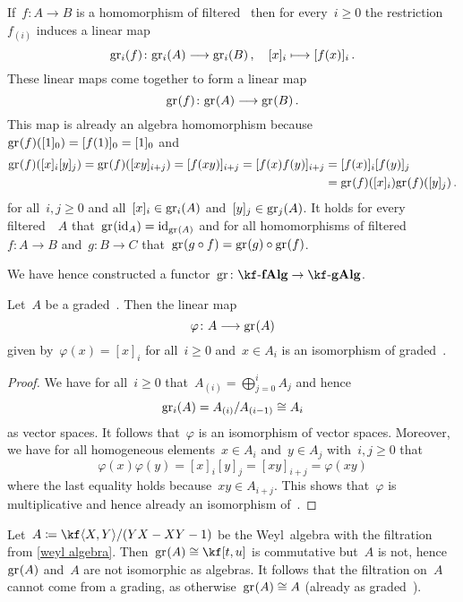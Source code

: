 \begin{construction}
  If~$f \colon A \to B$ is a homomorphism of filtered~{\algebras{$\kf$}} then for every~$i \geq 0$ the restriction~$f_{(i)}$ induces a linear map
  \[
    \gr[i](f)
    \colon
    \gr[i](A)
    \to
    \gr[i](B) \,,
    \quad
    [x]_i
    \mapsto
    [f(x)]_i  \,.
  \]
  These linear maps come together to form a linear map
  \[
    \gr(f)
    \colon
    \gr(A)
    \to
    \gr(B)  \,.
  \]
  This map is already an algebra homomorphism because~$\gr(f)([1]_0) = [f(1)]_0 = [1]_0$ and
  \begin{align*}
    \gr(f)( [x]_i [y]_j )
    =
    \gr(f)( [xy]_{i+j} )
    =
    [f(xy)]_{i+j}
    =
    [f(x) f(y)]_{i+j}
    &=
    [f(x)]_i [f(y)]_j
    \\
    &=
    \gr(f)([x]_i) \gr(f)([y]_j) \,.
  \end{align*}
  for all~$i, j \geq 0$ and all~$[x]_i \in \gr[i](A)$ and~$[y]_j \in \gr[j](A)$.  
  It holds for every filtered~{\algebra{$\kf$}}~$A$ that~$\gr(\id_A) = \id_{\gr(A)}$ and for all homomorphisms of filtered~{\algebras{$\kf$}}~$f \colon A \to B$ and~$g \colon B \to C$ that~$\gr(g \circ f) = \gr(g) \circ \gr(f)$.
  
  We have hence constructed a functor~$\gr \colon \cfAlg{\kf} \to \cgAlg{\kf}$.
\end{construction}


\begin{lemma}
  Let~$A$ be a graded~{\algebra{$\kf$}}.
  Then the linear map
  \[
    \varphi 
    \colon
    A
    \to
    \gr(A)
  \]
  given by~$\varphi(x) = [x]_i$ for all~$i \geq 0$ and~$x \in A_i$ is an isomorphism of graded~{\algebras{$\kf$}}.
\end{lemma}


\begin{proof}
  We have for all~$i \geq 0$ that~$A_{(i)} = \bigoplus_{j=0}^i A_j$ and hence
  \[
    \gr[i](A)
    =
    A_{(i)} / A_{(i-1)}
    \cong
    A_i
  \]
  as vector spaces.
  It follows that~$\varphi$ is an isomorphism of vector spaces.
  Moreover, we have for all homogeneous elements~$x \in A_i$ and~$y \in A_j$ with~$i, j \geq 0$ that
  \[
    \varphi(x) \varphi(y)
    =
    [x]_i [y]_j
    =
    [xy]_{i+j}
    =
    \varphi(xy)
  \]
  where the last equality holds because~$xy \in A_{i+j}$.
  This shows that~$\varphi$ is multiplicative and hence already an isomorphism of~{\algebras{$\kf$}}.
\end{proof}


\begin{example}
  Let~$A \defined \kf\gen{X, Y}/(YX - XY - 1)$ be the Weyl~algebra with the filtration from \cref{weyl algebra}.
  Then~$\gr(A) \cong \kf[t,u]$ is commutative but~$A$ is not, hence~$\gr(A)$ and~$A$ are not isomorphic as algebras.
  It follows that the filtration on~$A$ cannot come from a grading, as otherwise~$\gr(A) \cong A$ (already as graded~{\algebras{$\kf$}}).
\end{example}


